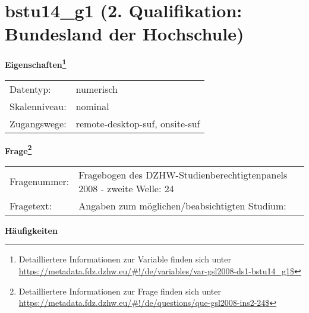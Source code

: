 
    \setcounter{footnote}{0}

    \vspace*{-1.8cm}
	\section{bstu14\_g1 (2. Qualifikation: Bundesland der Hochschule)}
	\label{section:bstu14_g1}



    \vspace*{0.5cm}
    \noindent\textbf{Eigenschaften\footnote{Detailliertere Informationen zur Variable finden sich unter
		\url{https://metadata.fdz.dzhw.eu/\#!/de/variables/var-gsl2008-ds1-bstu14_g1$}}}\\
	\begin{tabularx}{\hsize}{@{}lX}
	Datentyp: & numerisch \\
	Skalenniveau: & nominal \\
	Zugangswege: &
	  remote-desktop-suf, 
	  onsite-suf
 \\
    \end{tabularx}



				\vspace*{0.5cm}
                \noindent\textbf{Frage\footnote{Detailliertere Informationen zur Frage finden sich unter
		              \url{https://metadata.fdz.dzhw.eu/\#!/de/questions/que-gsl2008-ins2-24$}}}\\
				\begin{tabularx}{\hsize}{@{}lX}
					Fragenummer: &
					  Fragebogen des DZHW-Studienberechtigtenpanels 2008 - zweite Welle:
					  24
 \\
					Fragetext: & Angaben zum möglichen/beabsichtigten Studium: \\
				\end{tabularx}





        		\vspace*{0.5cm}
                \noindent\textbf{Häufigkeiten}


